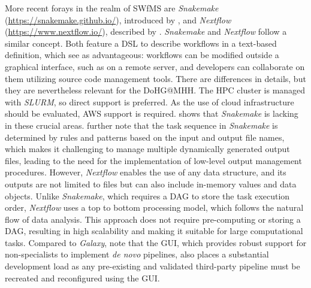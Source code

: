 More recent forays in the realm of \ac{SWfMS} are \textit{Snakemake} (\url{https://snakemake.github.io/}), introduced by \citeauthor{koster2012} \autocite{koster2012}, and \textit{Nextflow} (\url{https://www.nextflow.io/}), described by \citeauthor{ditommaso2017} \autocite{ditommaso2017}. \textit{Snakemake} and \textit{Nextflow} follow a similar concept. Both feature a \ac{DSL} to describe workflows in a text-based definition, which \citeauthor{koster2012} see as advantageous: workflows can be modified outside a graphical interface, such as on a remote server, and developers can collaborate on them utilizing source code management tools. There are differences in details, but they are nevertheless relevant for the \ac{DoHG@MHH}. The \ac{HPC} cluster is managed with \textit{\ac{SLURM}}, so direct support is preferred. As the use of cloud infrastructure should be evaluated, \ac{AWS} support is required.  shows that \textit{Snakemake} is lacking in these crucial areas. \citeauthor{ditommaso2017} further note that the task sequence in \textit{Snakemake} is determined by rules and patterns based on the input and output file names, which makes it challenging to manage multiple dynamically generated output files, leading to the need for the implementation of low-level output management procedures. However, \textit{Nextflow} enables the use of any data structure, and its outputs are not limited to files but can also include in-memory values and data objects. Unlike \textit{Snakemake}, which requires a \ac{DAG} to store the task execution order, \textit{Nextflow} uses a top to bottom processing model, which follows the natural flow of data analysis. This approach does not require pre-computing or storing a \ac{DAG}, resulting in high scalability and making it suitable for large computational tasks. Compared to \textit{Galaxy}, \citeauthor{ditommaso2017} note that the \ac{GUI}, which provides robust support for non-specialists to implement \textit{de novo} pipelines, also places a substantial development load as any pre-existing and validated third-party pipeline must be recreated and reconfigured using the \ac{GUI}.

